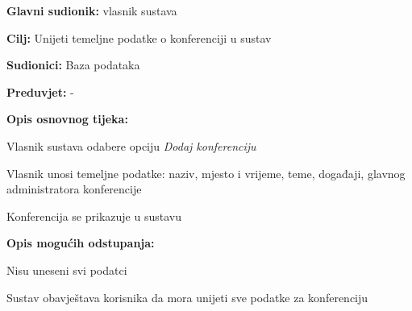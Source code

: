      \noindent {}
					\begin{packed_item}
	
						\item \textbf{Glavni sudionik: } vlasnik sustava
						\item  \textbf{Cilj:} Unijeti temeljne podatke o konferenciji u sustav
						\item  \textbf{Sudionici:} Baza podataka
						\item  \textbf{Preduvjet:} -
						\item  \textbf{Opis osnovnog tijeka:}
						
						\item[] \begin{packed_enum}
	
							\item Vlasnik sustava odabere opciju \textit{Dodaj konferenciju}
							\item Vlasnik unosi temeljne podatke: naziv, mjesto i vrijeme, teme, događaji, glavnog administratora konferencije
							\item Konferencija se prikazuje u sustavu
						\end{packed_enum}

                        \item  \textbf{Opis mogućih odstupanja:}
						
						\item[] \begin{packed_item}
	
							\item[1.] Nisu uneseni svi podatci

							\item[] \begin{packed_enum}
								
								\item Sustav obavještava korisnika da mora unijeti sve podatke za konferenciju
								
							\end{packed_enum}
							
						\end{packed_item}
						
					\end{packed_item}


